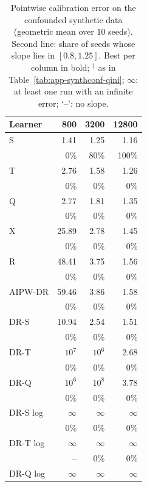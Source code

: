 \documentclass{article}
\begin{document}
\begin{table}[H]
\centering
\caption{Pointwise calibration error on the confounded synthetic data
(geometric mean over $10$ seeds). Second line: share of seeds whose slope lies in
$[0.8, 1.25]$. Best per column in bold; $^\dagger$ as in
Table~\ref{tab:app-synthconf-qini}; $\infty$: at least one run with an infinite error; `--': no slope.}
\label{tab:app-synthconf-cal}
\footnotesize
\setlength{\tabcolsep}{3pt}
\begin{tabular}{l|rrr}
\hline
Learner & 800 & 3200 & 12800 \\
\hline
S & 1.41 & 1.25 & 1.16 \\
 & \scriptsize 0\% & \scriptsize 80\% & \scriptsize 100\% \\[2pt]
T & 2.76 & 1.58 & 1.26 \\
 & \scriptsize 0\% & \scriptsize 0\% & \scriptsize 0\% \\[2pt]
\hline
Q & 2.77 & 1.81 & 1.35 \\
 & \scriptsize 0\% & \scriptsize 0\% & \scriptsize 0\% \\[2pt]
\hline
X & 25.89 & 2.78 & 1.45 \\
 & \scriptsize 0\% & \scriptsize 0\% & \scriptsize 0\% \\[2pt]
R & 48.41 & 3.75 & 1.56 \\
 & \scriptsize 0\% & \scriptsize 0\% & \scriptsize 0\% \\[2pt]
AIPW-DR & 59.46 & 3.86 & 1.58 \\
 & \scriptsize 0\% & \scriptsize 0\% & \scriptsize 0\% \\[2pt]
\hline
DR-S & 10.94 & 2.54 & 1.51 \\
 & \scriptsize 0\% & \scriptsize 0\% & \scriptsize 0\% \\[2pt]
DR-T & $10^{7}$ & $10^{6}$ & 2.68 \\
 & \scriptsize 0\% & \scriptsize 0\% & \scriptsize 0\% \\[2pt]
DR-Q & $10^{6}$ & $10^{8}$ & 3.78 \\
 & \scriptsize 0\% & \scriptsize 0\% & \scriptsize 0\% \\[2pt]
\hline
DR-S log & $\infty$ & $\infty$ & $\infty$ \\
 & \scriptsize 0\% & \scriptsize 0\% & \scriptsize 0\% \\[2pt]
DR-T log & $\infty$ & $\infty$ & $\infty$ \\
 & \scriptsize -- & \scriptsize 0\% & \scriptsize 0\% \\[2pt]
DR-Q log & $\infty$ & $\infty$ & $\infty$ \\

\end{tabular}
\end{table}
\end{document}
